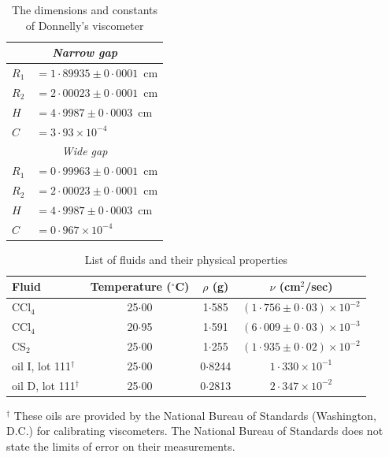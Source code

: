 \begin{table}[ht]
\centering
\caption{The dimensions and constants of Donnelly's viscometer}
\label{tab:XXXVI}
\medskip
\begin{tabular}{ll}
\hline
\multicolumn{2}{c}{\textit{Narrow gap}} \\
\hline
$R_1$ & $= 1{\cdot}89935 \pm 0{\cdot}0001$~cm \\
$R_2$ & $= 2{\cdot}00023 \pm 0{\cdot}0001$~cm \\
$H$   & $= 4{\cdot}9987 \pm 0{\cdot}0003$~cm \\
$C$   & $= 3{\cdot}93 \times 10^{-4}$ \\
\hline
\multicolumn{2}{c}{\textit{Wide gap}} \\
\hline
$R_1$ & $= 0{\cdot}99963 \pm 0{\cdot}0001$~cm \\
$R_2$ & $= 2{\cdot}00023 \pm 0{\cdot}0001$~cm \\
$H$   & $= 4{\cdot}9987 \pm 0{\cdot}0003$~cm \\
$C$   & $= 0{\cdot}967 \times 10^{-4}$ \\
\hline
\end{tabular}
\end{table}

\begin{table}[ht]
\centering
\caption{List of fluids and their physical properties}
\label{tab:XXXVII}
\medskip
\begin{tabular}{lccc}
\hline
Fluid & Temperature (${}^{\circ}$C) & $\rho$ (g) & $\nu$ (cm$^2$/sec) \\
\hline
CCl$_4$                          & 25$\cdot$00 & 1$\cdot$585 & $(1{\cdot}756 \pm 0{\cdot}03) \times 10^{-2}$ \\
CCl$_4$                          & 20$\cdot$95 & 1$\cdot$591 & $(6{\cdot}009 \pm 0{\cdot}03) \times 10^{-3}$ \\
CS$_2$                           & 25$\cdot$00 & 1$\cdot$255 & $(1{\cdot}935 \pm 0{\cdot}02) \times 10^{-2}$ \\
oil I, lot 111$^{\dag}$          & 25$\cdot$00 & 0$\cdot$8244 & $1{\cdot}330 \times 10^{-1}$ \\
oil D, lot 111$^{\dag}$          & 25$\cdot$00 & 0$\cdot$2813 & $2{\cdot}347 \times 10^{-2}$ \\
\hline
\end{tabular}

\smallskip
{\footnotesize $^{\dag}$ These oils are provided by the National Bureau of Standards (Washington, D.C.)
for calibrating viscometers. The National Bureau of Standards does not state the limits
of error on their measurements.}
\end{table}

